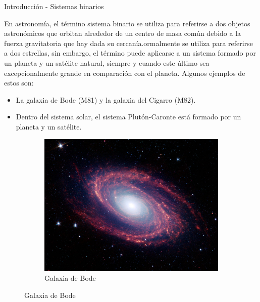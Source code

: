 \begin{frame}{Introducción - Sistemas binarios}
    \begin{minipage}{0.70\linewidth}
        En astronomía, el término sistema binario se utiliza para referirse a dos objetos 
        astronómicos que orbitan alrededor de un centro de masa común debido a la fuerza
        gravitatoria que hay dada su cercanía.ormalmente se utiliza para referirse a dos
        estrellas, sin embargo, el término puede aplicarse a un sistema formado por un
        planeta y un satélite natural, siempre y cuando este último sea excepcionalmente
        grande en comparación con el planeta. Algunos ejemplos de estos son:
        \begin{itemize}
            \item La galaxia de Bode (M81) y la galaxia del Cigarro (M82).
            \item Dentro del sistema solar, el sistema Plutón-Caronte está formado por un
            planeta y un satélite.
        \end{itemize}
    \end{minipage}
    \hspace{1cm}
    \begin{minipage}{0.20\linewidth}
        \vspace{0.5cm}
        \begin{figure}[H]
            \centering
            \begin{subfigure}{1\linewidth}
                \centering
                \includegraphics[scale=0.3]{images/bode.jpg}
                \caption{Galaxia de Bode}
            \end{subfigure}

\end{figure}
\end{minipage}
\end{frame}
